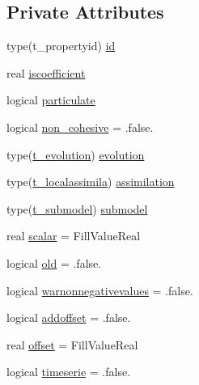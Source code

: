 \subsection*{Private Attributes}
\begin{DoxyCompactItemize}
\item 
type(t\+\_\+propertyid) \mbox{\hyperlink{structmodulewaterproperties_1_1t__property_a320e19ce1a104ade6b079b3befef4f13}{id}}
\item 
real \mbox{\hyperlink{structmodulewaterproperties_1_1t__property_aeab13d2f93c9b4209f97c6e2cdb0d91b}{iscoefficient}}
\item 
logical \mbox{\hyperlink{structmodulewaterproperties_1_1t__property_a0096409fa14c433bf88d4325ca5b3741}{particulate}}
\item 
logical \mbox{\hyperlink{structmodulewaterproperties_1_1t__property_adef27a94f0f3fe5317305ab12c5e12fb}{non\+\_\+cohesive}} = .false.
\item 
type(\mbox{\hyperlink{structmodulewaterproperties_1_1t__evolution}{t\+\_\+evolution}}) \mbox{\hyperlink{structmodulewaterproperties_1_1t__property_a769db230282d46ab90b17f30b56b7e71}{evolution}}
\item 
type(\mbox{\hyperlink{structmodulewaterproperties_1_1t__localassimila}{t\+\_\+localassimila}}) \mbox{\hyperlink{structmodulewaterproperties_1_1t__property_aa87d78f27981ae1119ec3e240b0799de}{assimilation}}
\item 
type(\mbox{\hyperlink{structmodulewaterproperties_1_1t__submodel}{t\+\_\+submodel}}) \mbox{\hyperlink{structmodulewaterproperties_1_1t__property_aec67c07763280f2d085615faf845ed8c}{submodel}}
\item 
real \mbox{\hyperlink{structmodulewaterproperties_1_1t__property_ac3ab24da01dd0e8401c586427c99b119}{scalar}} = Fill\+Value\+Real
\item 
logical \mbox{\hyperlink{structmodulewaterproperties_1_1t__property_ae964ee0de3e4fd32ce9326f538b26c70}{old}} = .false.
\item 
logical \mbox{\hyperlink{structmodulewaterproperties_1_1t__property_af34aefc6addade05e2681e1e5147fd7e}{warnonnegativevalues}} = .false.
\item 
logical \mbox{\hyperlink{structmodulewaterproperties_1_1t__property_a0315fc1293e4614ebe9e92c079dac692}{addoffset}} = .false.
\item 
real \mbox{\hyperlink{structmodulewaterproperties_1_1t__property_a2c5924f9b04d684e1fac7f3897b95697}{offset}} = Fill\+Value\+Real
\item 
logical \mbox{\hyperlink{structmodulewaterproperties_1_1t__property_ad6b54b1215e60b23ba204172ee8abefe}{timeserie}} = .false.

\end{DoxyCompactItemize}
